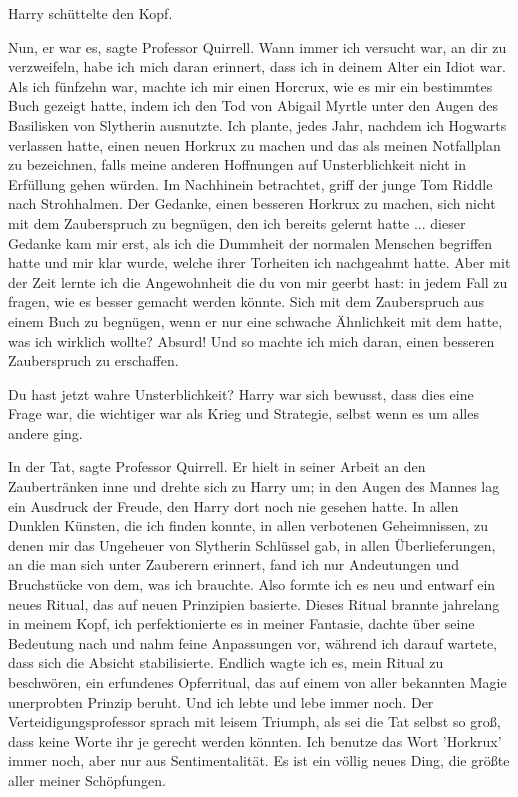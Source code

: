 Harry schüttelte den Kopf.

\glqq{}Nun, er war es\grqq{}, sagte Professor Quirrell. \glqq{}Wann immer ich
versucht war, an dir zu verzweifeln, habe ich mich daran erinnert, dass ich in
deinem Alter ein Idiot war. Als ich fünfzehn war, machte ich mir einen Horcrux,
wie es mir ein bestimmtes Buch gezeigt hatte, indem ich den Tod von Abigail
Myrtle unter den Augen des Basilisken von Slytherin ausnutzte. Ich plante, jedes
Jahr, nachdem ich Hogwarts verlassen hatte, einen neuen Horkrux zu machen und
das als meinen Notfallplan zu bezeichnen, falls meine anderen Hoffnungen auf
Unsterblichkeit nicht in Erfüllung gehen würden. Im Nachhinein betrachtet, griff
der junge Tom Riddle nach Strohhalmen. Der Gedanke, einen besseren Horkrux zu
machen, sich nicht mit dem Zauberspruch zu begnügen, den ich bereits gelernt
hatte ... dieser Gedanke kam mir erst, als ich die Dummheit der normalen
Menschen begriffen hatte und mir klar wurde, welche ihrer Torheiten ich
nachgeahmt hatte. Aber mit der Zeit lernte ich die Angewohnheit die du von mir
geerbt hast: in jedem Fall zu fragen, wie es besser gemacht werden könnte. Sich
mit dem Zauberspruch aus einem Buch zu begnügen, wenn er nur eine schwache
Ähnlichkeit mit dem hatte, was ich wirklich wollte? Absurd! Und so machte ich
mich daran, einen besseren Zauberspruch zu erschaffen.\grqq{}

\glqq{}Du hast jetzt wahre Unsterblichkeit?\grqq{} Harry war sich bewusst, dass
dies eine Frage war, die wichtiger war als Krieg und Strategie, selbst wenn es
um alles andere ging.

\glqq{}In der Tat\grqq{}, sagte Professor Quirrell. Er hielt in seiner Arbeit an
den Zaubertränken inne und drehte sich zu Harry um; in den Augen des Mannes lag
ein Ausdruck der Freude, den Harry dort noch nie gesehen hatte. \glqq{}In allen
Dunklen Künsten, die ich finden konnte, in allen verbotenen Geheimnissen, zu
denen mir das Ungeheuer von Slytherin Schlüssel gab, in allen Überlieferungen,
an die man sich unter Zauberern erinnert, fand ich nur Andeutungen und
Bruchstücke von dem, was ich brauchte. Also formte ich es neu und entwarf ein
neues Ritual, das auf neuen Prinzipien basierte. Dieses Ritual brannte jahrelang
in meinem Kopf, ich perfektionierte es in meiner Fantasie, dachte über seine
Bedeutung nach und nahm feine Anpassungen vor, während ich darauf wartete, dass
sich die Absicht stabilisierte. Endlich wagte ich es, mein Ritual zu beschwören,
ein erfundenes Opferritual, das auf einem von aller bekannten Magie unerprobten
Prinzip beruht. Und ich lebte und lebe immer noch.\grqq{} Der
Verteidigungsprofessor sprach mit leisem Triumph, als sei die Tat selbst so
groß, dass keine Worte ihr je gerecht werden könnten. \glqq{}Ich benutze das Wort
'Horkrux' immer noch, aber nur aus Sentimentalität. Es ist ein völlig neues
Ding, die größte aller meiner Schöpfungen.\grqq{}

